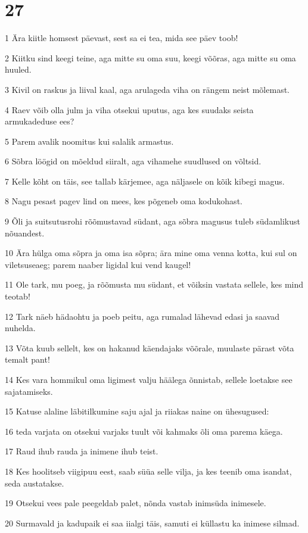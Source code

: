 \chapter{27}

\par 1 Ära kiitle homsest päevast, sest sa ei tea, mida see päev toob!
\par 2 Kiitku sind keegi teine, aga mitte su oma suu, keegi võõras, aga mitte su oma huuled.
\par 3 Kivil on raskus ja liival kaal, aga arulageda viha on rängem neist mõlemast.
\par 4 Raev võib olla julm ja viha otsekui uputus, aga kes suudaks seista armukadeduse ees?
\par 5 Parem avalik noomitus kui salalik armastus.
\par 6 Sõbra löögid on mõeldud siiralt, aga vihamehe suudlused on võltsid.
\par 7 Kelle kõht on täis, see tallab kärjemee, aga näljasele on kõik kibegi magus.
\par 8 Nagu pesast pagev lind on mees, kes põgeneb oma kodukohast.
\par 9 Õli ja suitsutusrohi rõõmustavad südant, aga sõbra magusus tuleb südamlikust nõuandest.
\par 10 Ära hülga oma sõpra ja oma isa sõpra; ära mine oma venna kotta, kui sul on viletsuseaeg; parem naaber ligidal kui vend kaugel!
\par 11 Ole tark, mu poeg, ja rõõmusta mu südant, et võiksin vastata sellele, kes mind teotab!
\par 12 Tark näeb hädaohtu ja poeb peitu, aga rumalad lähevad edasi ja saavad nuhelda.
\par 13 Võta kuub sellelt, kes on hakanud käendajaks võõrale, muulaste pärast võta temalt pant!
\par 14 Kes vara hommikul oma ligimest valju häälega õnnistab, sellele loetakse see sajatamiseks.
\par 15 Katuse alaline läbitilkumine saju ajal ja riiakas naine on ühesugused:
\par 16 teda varjata on otsekui varjaks tuult või kahmaks õli oma parema käega.
\par 17 Raud ihub rauda ja inimene ihub teist.
\par 18 Kes hoolitseb viigipuu eest, saab süüa selle vilja, ja kes teenib oma isandat, seda austatakse.
\par 19 Otsekui vees pale peegeldab palet, nõnda vastab inimsüda inimesele.
\par 20 Surmavald ja kadupaik ei saa iialgi täis, samuti ei küllastu ka inimese silmad.
